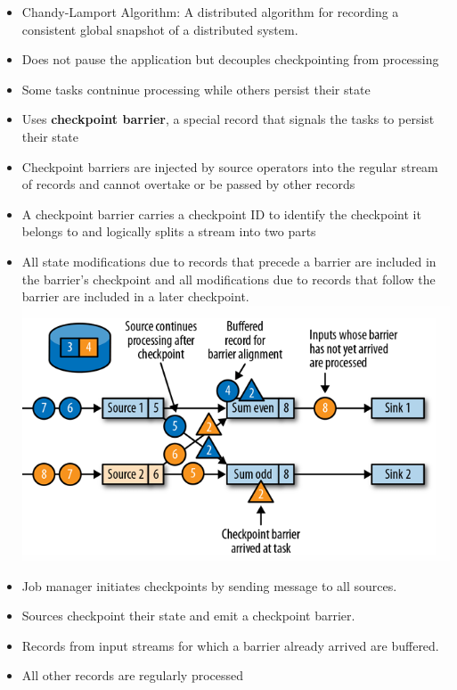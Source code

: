 \documentclass[10pt, landscape]{article}
\begin{document}
\begin{multicols*}{4}
\begin{itemize}
\begin{itemize}
\begin{itemize}
                \item Chandy-Lamport Algorithm: A distributed algorithm for recording a consistent global snapshot of a distributed system.
                \item Does not pause the application but decouples checkpointing from processing
                \item Some tasks contninue processing while others persist their state
                \item Uses \textbf{checkpoint barrier}, a special record that signals the tasks to persist their state
                \item Checkpoint barriers are injected by source operators into the regular 
                stream of records and cannot overtake or be passed by other records
                \item A checkpoint barrier carries a checkpoint ID to identify the checkpoint it 
                belongs to and logically splits a stream into two parts
                \item All state modifications due to records that precede a barrier are 
                included in the barrier’s checkpoint and all modifications due to records 
                that follow the barrier are included in a later checkpoint.
                \includegraphics[width=0.95\linewidth]{flink_checkpoint_buffer.png}
                \item Job manager initiates checkpoints by sending message to all sources.
                \item Sources checkpoint their state and emit a checkpoint barrier.
                \item Records from input streams for which a barrier already arrived are buffered.
                \item All other records are regularly processed

\end{itemize}
\end{itemize}
\end{itemize}
\end{multicols*}
\end{document}
